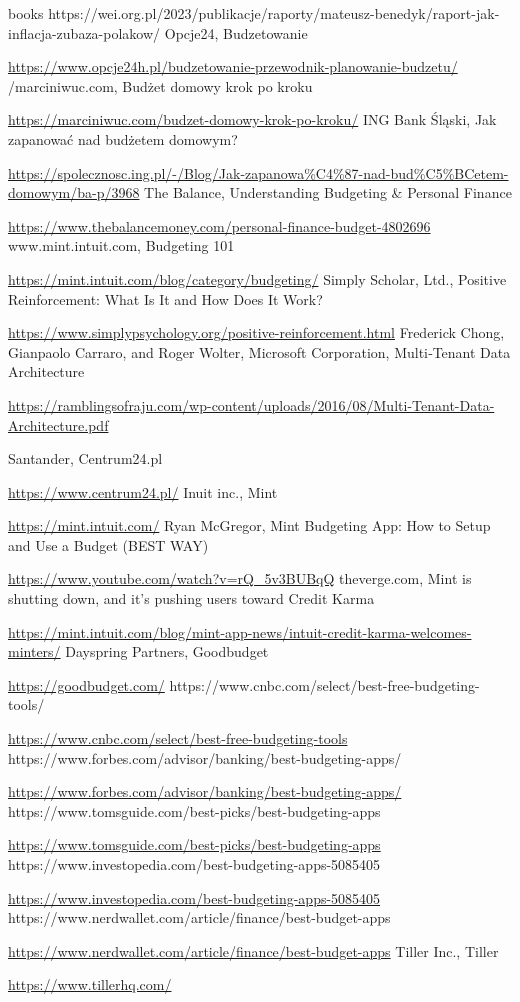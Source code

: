 \documentclass[a4paper,10pt, twoside]{report}
\begin{document}
\begin{large}
\begin{thebibliography} {books}
{        https://wei.org.pl/2023/publikacje/raporty/mateusz-benedyk/raport-jak-inflacja-zubaza-polakow/}
     Opcje24, Budzetowanie \raggedright\url{
        https://www.opcje24h.pl/budzetowanie-przewodnik-planowanie-budzetu/}
     /marciniwuc.com, Budżet domowy krok po kroku \raggedright\url{
        https://marciniwuc.com/budzet-domowy-krok-po-kroku/}
     ING Bank Śląski, Jak zapanować nad budżetem domowym? \raggedright\url{
        https://spolecznosc.ing.pl/-/Blog/Jak-zapanowa\%C4\%87-nad-bud\%C5\%BCetem-domowym/ba-p/3968}
     The Balance, Understanding Budgeting \& Personal Finance\raggedright\url{
        https://www.thebalancemoney.com/personal-finance-budget-4802696}
     www.mint.intuit.com, Budgeting 101 \raggedright\url{
        https://mint.intuit.com/blog/category/budgeting/}
     Simply Scholar, Ltd., Positive Reinforcement: What Is It and How Does It Work? \raggedright\url{
        https://www.simplypsychology.org/positive-reinforcement.html}
     Frederick Chong, Gianpaolo Carraro, and Roger Wolter, Microsoft Corporation, Multi‐Tenant Data Architecture \raggedright\url{
        https://ramblingsofraju.com/wp-content/uploads/2016/08/Multi-Tenant-Data-Architecture.pdf}

     Santander, Centrum24.pl \raggedright\url{
        https://www.centrum24.pl/}
     Inuit inc., Mint \raggedright\url{
        https://mint.intuit.com/}
     Ryan McGregor, Mint Budgeting App: How to Setup and Use a Budget (BEST WAY) \raggedright\url{
        https://www.youtube.com/watch?v=rQ_5v3BUBqQ}
     theverge.com, Mint is shutting down, and it’s pushing users toward Credit Karma \raggedright\url{
        https://mint.intuit.com/blog/mint-app-news/intuit-credit-karma-welcomes-minters/}
     Dayspring Partners, Goodbudget \raggedright\url{
        https://goodbudget.com/}
     https://www.cnbc.com/select/best-free-budgeting-tools/ \raggedright\url{
        https://www.cnbc.com/select/best-free-budgeting-tools}
     https://www.forbes.com/advisor/banking/best-budgeting-apps/ \raggedright\url{
        https://www.forbes.com/advisor/banking/best-budgeting-apps/}
     https://www.tomsguide.com/best-picks/best-budgeting-apps \raggedright\url{
        https://www.tomsguide.com/best-picks/best-budgeting-apps}
     https://www.investopedia.com/best-budgeting-apps-5085405 \raggedright\url{
        https://www.investopedia.com/best-budgeting-apps-5085405}
     https://www.nerdwallet.com/article/finance/best-budget-apps \raggedright\url{
        https://www.nerdwallet.com/article/finance/best-budget-apps}
     Tiller Inc., Tiller \raggedright\url{
        https://www.tillerhq.com/}


\end{thebibliography}
\end{large}
\end{document}
